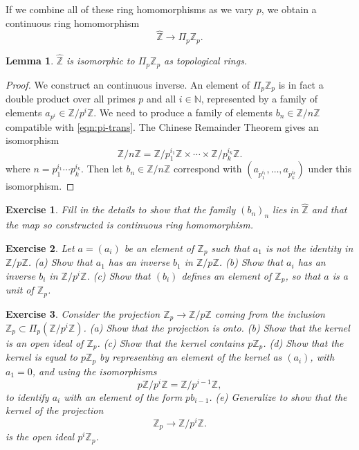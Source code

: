 \documentclass{amsart}
\newcommand{\ring}[1]{\mathbb{#1}}
\newtheorem{lemma}[equation]{Lemma}
\newtheorem{exercise}{Exercise}
\begin{document}
If we combine all of these ring homomorphisms as we vary $p$, we obtain a 
continuous ring homomorphism
\[
\hat{\ring{Z}}\to\Pi_p \ring{Z}_p.
\]

\begin{lemma}
$\hat{\ring{Z}}$ is isomorphic to $\Pi_p \ring{Z}_p$ as topological rings.
\end{lemma}

\begin{proof}
We construct an continuous inverse.
An element of $\Pi_p \ring{Z}_p$ is in fact a double product over all primes $p$ and all
$i\in\ring{N}$, represented by a family of elements $a_{p^i}\in\ring{Z}/p^i\ring{Z}$.
We need to produce a family of elements $b_n\in\ring{Z}/n\ring{Z}$ compatible
with \eqref{eqn:pi-trans}.  The Chinese Remainder Theorem 
\cite[page 402]{knapp-basic} gives an isomorphism
\[
\ring{Z}/n\ring{Z} = \ring{Z}/p_1^{i_1}\ring{Z} \times \cdots\times
\ring{Z}/p_k^{i_k}\ring{Z}.
\]
where $n=p_1^{i_1}\cdots p_k^{i_k}$.  Then let $b_n\in\ring{Z}/n\ring{Z}$
correspond with $(a_{p_1^{i_1}},\ldots,a_{p_k^{i_k}})$ under this isomorphism.
\end{proof}

\begin{exercise}
Fill in the details to show that the family $(b_n)_n$ lies in $\hat{\ring{Z}}$ and
that the map so constructed is continuous ring homomorphism.
\end{exercise}

\begin{exercise}
Let $a = (a_i)$ be an element of $\ring{Z}_p$ such that $a_1$ is not the identity
in $\ring{Z}/p\ring{Z}$.  (a) Show that $a_1$ has an inverse $b_1$ in
$\ring{Z}/p\ring{Z}$.  (b) Show that $a_i$ has an inverse $b_i$ in
$\ring{Z}/p^i\ring{Z}$.  (c) Show that $(b_i)$ defines an element of $\ring{Z}_p$,
so that $a$ is a unit of $\ring{Z}_p$.
\end{exercise}

\begin{exercise}  Consider the projection $\ring{Z}_p\to\ring{Z}/p\ring{Z}$
coming from the inclusion $\ring{Z}_p\subset\Pi_p (\ring{Z}/p^i\ring{Z})$.
(a) Show that the projection is onto.
(b) Show that the kernel is an open ideal of $\ring{Z}_p$.  (c) Show that
the kernel contains $p\ring{Z}_p$.  (d) Show that the kernel is equal
to $p\ring{Z}_p$ by representing an element of the kernel as $(a_i)$, with $a_1=0$,
and using the isomorphisms
\[
p \ring{Z}/p^i\ring{Z} = \ring{Z}/p^{i-1}\ring{Z},
\]
to identify $a_i$ with an element of the form $p b_{i-1}$.
(e) Generalize to show that the kernel of the projection 
\[
\ring{Z}_p\to\ring{Z}/p^i\ring{Z}.
\]
is the open ideal $p^i\ring{Z}_p$.
\end{exercise}
\end{document}
